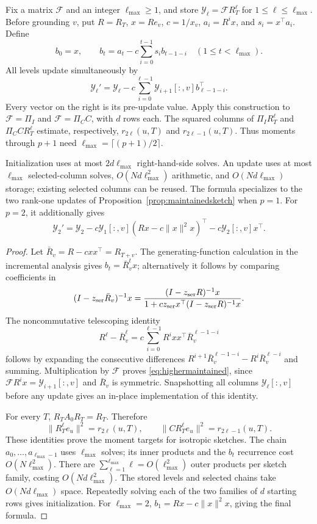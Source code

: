 \begin{proposition}
\label{prop:highermaintained}
Fix a matrix $\mathcal F$ and an integer $\ell_{\max}\geq1$, and store
$\mathcal Y_\ell=\mathcal F R_T^\ell$ for $1\leq\ell\leq \ell_{\max}$.
Before grounding $v$, put $R=R_T$, $x=Re_v$, $c=1/x_v$,
$a_i=R^ix$, and $s_i=x^\top a_i$. Define
\[
 b_0=x,\qquad
 b_t=a_t-c\sum_{i=0}^{t-1}s_i b_{t-1-i}
 \quad(1\leq t<\ell_{\max}).
\]
All levels update simultaneously by
\begin{equation}\label{eq:highermaintained}
 \mathcal Y_\ell'=\mathcal Y_\ell-c\sum_{i=0}^{\ell-1}
             \mathcal Y_{i+1}[:,v]b_{\ell-1-i}^\top.
\end{equation}
Every vector on the right is its pre-update value.
Apply this construction to $\mathcal F=\Pi_I$ and $\mathcal F=\Pi_C C$, with $d$ rows each.
The squared columns of $\Pi_I R_T^\ell$ and $\Pi_C C R_T^\ell$ estimate,
respectively, $r_{2\ell}(u,T)$ and $r_{2\ell-1}(u,T)$.
Thus moments through $p+1$ need $\ell_{\max}=\lceil(p+1)/2\rceil$.

Initialization uses at most $2d\ell_{\max}$ right-hand-side solves.
An update uses at most $\ell_{\max}$ selected-column solves,
$O(Nd\ell_{\max}^2)$ arithmetic, and $O(Nd\ell_{\max})$ storage; existing selected
columns can be reused. The formula specializes to the two
rank-one updates of Proposition~\ref{prop:maintainedsketch}
when $p=1$. For $p=2$, it additionally gives
\[
 \mathcal Y_2'=\mathcal Y_2-c\mathcal Y_1[:,v](Rx-c\|x\|^2x)^\top
                 -c\mathcal Y_2[:,v]x^\top.
\]
\end{proposition}
\begin{proof}
Let $\bar R_v=R-cxx^\top=R_{T+v}$. The generating-function calculation
in the incremental analysis gives $b_t=\bar R_v^tx$; alternatively it follows by comparing
coefficients in
\[
 (I-z_{\rm ser}\bar R_v)^{-1}x=
 \frac{(I-z_{\rm ser}R)^{-1}x}{1+c z_{\rm ser}x^\top(I-z_{\rm ser}R)^{-1}x}.
\]
The noncommutative telescoping identity
\[
 R^\ell-\bar R_v^\ell=c\sum_{i=0}^{\ell-1}R^ixx^\top \bar R_v^{\ell-1-i}
\]
follows by expanding the consecutive differences
$R^{i+1}\bar R_v^{\ell-1-i}-R^i\bar R_v^{\ell-i}$ and summing.
Multiplication by $\mathcal F$ proves \eqref{eq:highermaintained}, since
$\mathcal F R^ix=\mathcal Y_{i+1}[:,v]$ and $\bar R_v$ is symmetric.
Snapshotting all columns $\mathcal Y_\ell[:,v]$ before any update gives
an in-place implementation of this identity.

For every $T$, $R_TA_0R_T=R_T$. Therefore
\[
 \|R_T^\ell e_u\|^2=r_{2\ell}(u,T),\qquad
 \|CR_T^\ell e_u\|^2=r_{2\ell-1}(u,T).
\]
These identities prove the moment targets for isotropic sketches.
The chain $a_0,\ldots,a_{\ell_{\max}-1}$ uses $\ell_{\max}$ solves; its inner
products and the $b_t$ recurrence cost $O(N\ell_{\max}^2)$.
There are $\sum_{\ell=1}^{\ell_{\max}}\ell=O(\ell_{\max}^2)$ outer products per
sketch family, costing $O(Nd\ell_{\max}^2)$. The stored levels and
selected chains take $O(Nd\ell_{\max})$ space. Repeatedly solving each
of the two families of $d$ starting rows gives initialization.
For $\ell_{\max}=2$, $b_1=Rx-c\|x\|^2x$, giving the final formula.
\end{proof}



